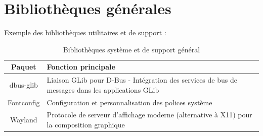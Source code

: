 





\section{Bibliothèques générales}
\label{subsec:general-lib}

Exemple  des bibliothèques utilitaires et de support :

\begin{table}[H]
    \centering
    \begin{tabular}{|c|p{8cm}|}
        \hline
        \textbf{Paquet}  & \textbf{Fonction principale} \\
        \hline
        dbus-glib & Liaison GLib pour D-Bus - Intégration des services de bus de messages dans les applications GLib \\
        \hline
        Fontconfig  & Configuration et personnalisation des polices système  \\
        \hline
        
        Wayland & Protocole de serveur d'affichage moderne (alternative à X11) pour la composition graphique \\
        \hline
        
    \end{tabular}
    \caption{Bibliothèques système et de support général}
    \label{tab:general-lib}
\end{table}




